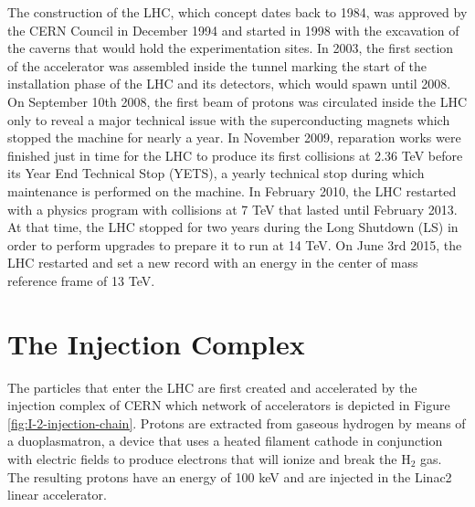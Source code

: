   The construction of the LHC, which concept dates back to 1984, was approved by the CERN Council in December 1994 and started in 1998 with the excavation of the caverns that would hold the experimentation sites. In 2003, the first section of the accelerator was assembled inside the tunnel marking the start of the installation phase of the LHC and its detectors, which would spawn until 2008. On September 10th 2008, the first beam of protons was circulated inside the LHC only to reveal a major technical issue with the superconducting magnets which stopped the machine for nearly a year. In November 2009, reparation works were finished just in time for the LHC to produce its first collisions at 2.36 TeV before its Year End Technical Stop (YETS), a yearly technical stop during which maintenance is performed on the machine. In February 2010, the LHC restarted with a physics program with collisions at 7 TeV that lasted until February 2013. At that time, the LHC stopped for two years during the Long Shutdown (LS) in order to perform upgrades to prepare it to run at 14 TeV. On June 3rd 2015, the LHC restarted and set a new record with an energy in the center of mass reference frame of 13 TeV.

  \section{The Injection Complex}

    The particles that enter the LHC are first created and accelerated by the injection complex of CERN which network of accelerators is depicted in Figure \ref{fig:I-2-injection-chain}. Protons are extracted from gaseous hydrogen by means of a duoplasmatron, a device that uses a heated filament cathode in conjunction with electric fields to produce electrons that will ionize and break the H$_2$ gas. The resulting protons have an energy of 100 keV and are injected in the Linac2 linear accelerator. \\

